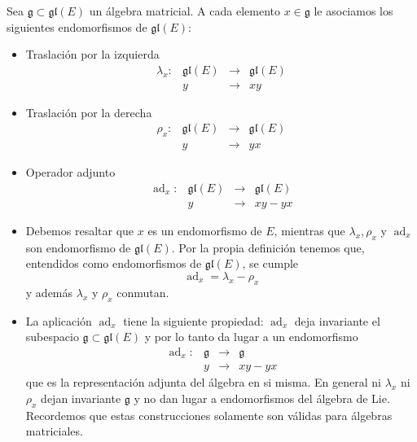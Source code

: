 \documentclass[a4paper,draft,12pt]{article}
\newcommand{\g}{\mathfrak{g}}%
\newcommand{\lto}{\longrightarrow}%
\DeclareMathOperator{\ad}{ad}  %
\begin{document}
Sea $\g \subset \mathfrak{gl}(E)$ un álgebra matricial.  A cada elemento $x \in \g$ le asociamos los siguientes endomorfismos de $\mathfrak{gl}(E)$:
\begin{itemize}

\item Traslación por la izquierda
$$
\begin{array}{lccc}
\lambda_x :& \mathfrak{gl}(E)& \lto &\mathfrak{gl}(E)\\
           &  y  & \lto & xy
\end{array}
$$

 \item Traslación por la derecha
$$
\begin{array}{lccc}
\rho_x :& \mathfrak{gl}(E) &\lto &\mathfrak{gl}(E)\\
           &  y  & \lto & yx
\end{array}
$$

\item Operador adjunto
$$
\begin{array}{lccc}
\ad_x :& \mathfrak{gl}(E) &\lto &\mathfrak{gl}(E)\\
           &  y  & \lto & xy-yx
\end{array}
$$
\end{itemize}




\begin{itemize}

\item  Debemos resaltar que $x$ es un endomorfismo de $E$, mientras que $\lambda_x,\rho_x$ y $\ad_x$ son endomorfismo de $\mathfrak{gl}(E)$. Por la propia definición tenemos que, entendidos como endomorfismos de $\mathfrak{gl}(E)$, se cumple
$$
\ad_x = \lambda_x -\rho_x
$$
y además $\lambda_x$ y $\rho_x$ conmutan.

\item La aplicación $\ad_x$ tiene la siguiente propiedad: $\ad_x$ deja invariante el subespacio $\g \subset \mathfrak{gl}(E)$ y por lo tanto da lugar a un endomorfismo
$$
\begin{array}{lccc}
\ad_x :& \g &\lto &\g\\
           &  y  & \lto & xy-yx
\end{array}
$$
que es la representación adjunta del álgebra en si misma.
 En general ni $\lambda_x$ ni $\rho_x$ dejan invariante $\g$ y  no dan lugar a endomorfismos del álgebra de Lie.  Recordemos que estas construcciones solamente son válidas para álgebras matriciales.


\end{itemize}
\end{document}
